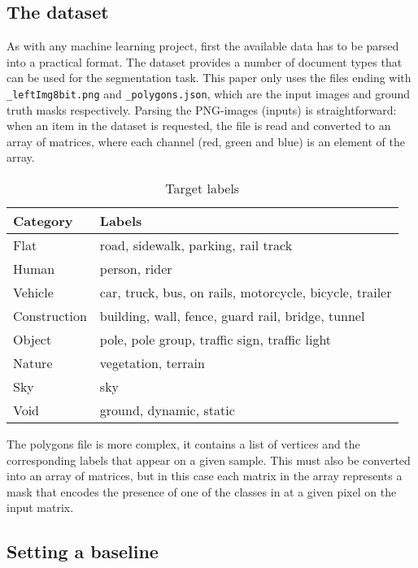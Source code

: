 \subsection{The dataset}
\label{dataset}

As with any machine learning project, first the available data has to be parsed into a practical format.
The dataset provides a number of document types that can be used for the segmentation task.
This paper only uses the files ending with \texttt{\_leftImg8bit.png} and \texttt{\_polygons.json}, which are the input images and ground truth masks respectively.
Parsing the PNG-images (inputs) is straightforward: when an item in the dataset is requested, the file is read and converted to an array of matrices, where each channel (red, green and blue) is an element of the array. 

\begin{table}
    \centering
    \caption{Target labels}
    \label{tab:labels}
    \begin{tabular}{ll}
        \hline
        Category    & Labels \\
        \hline
        Flat        & road, sidewalk, parking, rail track \\
        Human       & person, rider \\
        Vehicle     & car, truck, bus, on rails, motorcycle, bicycle, trailer \\
        Construction& building, wall, fence, guard rail, bridge, tunnel \\
        Object      & pole, pole group, traffic sign, traffic light \\
        Nature      & vegetation, terrain \\
        Sky	        & sky \\
        Void        & ground, dynamic, static \\
        \hline
    \end{tabular}
\end{table}

The polygons file is more complex, it contains a list of vertices and the corresponding labels that appear on a given sample. 
This must also be converted into an array of matrices, but in this case each matrix in the array represents a mask that encodes the presence of one of the classes in  at a given pixel on the input matrix.


\subsection{Setting a baseline}
\label{subsec:baseline}


